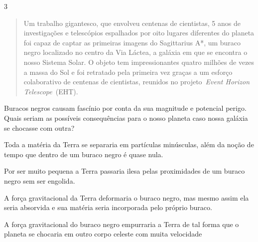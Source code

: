 \num{3}
\begin{quote}
Um trabalho gigantesco, que envolveu centenas de cientistas, 5 anos
de investigações e telescópios espalhados por oito lugares diferentes
do planeta foi capaz de captar as primeiras imagens do Sagittarius A*,
um buraco negro localizado no centro da Via Láctea, a galáxia em que
se encontra o nosso Sistema Solar. O objeto tem impressionantes quatro
milhões de vezes a massa do Sol e foi retratado pela primeira vez
graças a um esforço colaborativo de centenas de cientistas, reunidos
no projeto~\emph{Event Horizon Telescope}~(EHT).

\end{quote}

Buracos negros causam fascínio por conta da sua magnitude e potencial
perigo. Quais seriam as possíveis consequências para o nosso planeta
caso nossa galáxia se chocasse com outra?

\begin{escolha}
\item
  Toda a matéria da Terra se separaria em partículas minúsculas, além da
  noção de tempo que dentro de um buraco negro é quase nula.
\item
  Por ser muito pequena a Terra passaria ilesa pelas proximidades de um
  buraco negro sem ser engolida.
\item
  A força gravitacional da Terra deformaria o buraco negro, mas mesmo
  assim ela seria absorvida e sua matéria seria incorporada pelo próprio
  buraco.
\item
  A força gravitacional do buraco negro empurraria a Terra de tal forma
  que o planeta se chocaria em outro corpo celeste com muita velocidade
\end{escolha}


